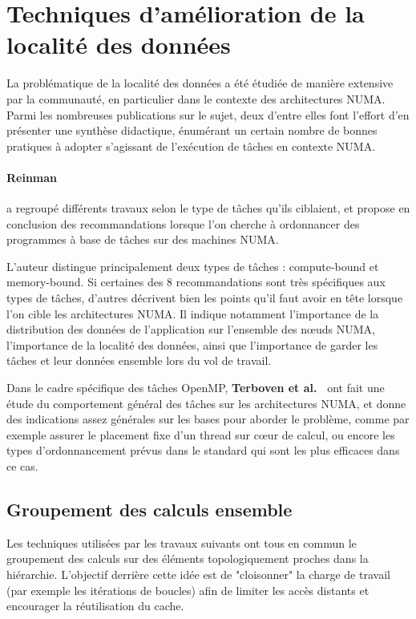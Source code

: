 \section{Techniques d'amélioration de la localité des données}\label{sec:rw:numa}


La problématique de la localité des données a été étudiée de manière extensive par la communauté, en particulier dans le contexte des architectures NUMA.
Parmi les nombreuses publications sur le sujet, deux d'entre elles font l'effort d'en présenter une synthèse didactique, énumérant un certain nombre de bonnes pratiques à adopter s'agissant de l'exécution de tâches en contexte NUMA.

\paragraph{Reinman~\cite{Reinman2015}} a regroupé différents travaux selon le type de tâches qu'ils ciblaient, et propose en conclusion des recommandations lorsque l'on cherche à ordonnancer des programmes à base de tâches sur des machines NUMA.

L'auteur distingue principalement deux types de tâches : compute-bound et memory-bound.
Si certaines des 8 recommandations sont très spécifiques aux types de tâches, d'autres décrivent bien les points qu'il faut avoir en tête lorsque l'on cible les architectures NUMA.
Il indique notamment l'importance de la distribution des données de l'application sur l'ensemble des nœuds NUMA, l'importance de la localité des données, ainsi que l'importance de garder les tâches et leur données ensemble lors du vol de travail.

Dans le cadre spécifique des tâches OpenMP, \textbf{Terboven et al.~\cite{Terboven2012}} ont fait une étude du comportement général des tâches sur les architectures NUMA, et donne des indications assez générales sur les bases pour aborder le problème, comme par exemple assurer le placement fixe d'un thread sur cœur de calcul, ou encore les types d'ordonnancement prévus dans le standard qui sont les plus efficaces dans ce cas.



\subsection{Groupement des calculs ensemble}

Les techniques utilisées par les travaux suivants ont tous en commun le groupement des calculs sur des éléments topologiquement proches dans la hiérarchie.
L'objectif derrière cette idée est de "cloisonner" la charge de travail (par exemple les itérations de boucles) afin de limiter les accès distants et encourager la réutilisation du cache.

